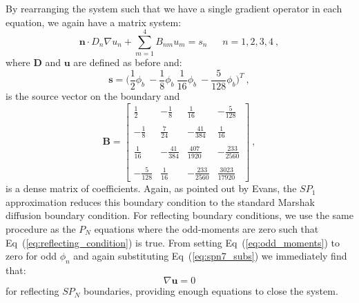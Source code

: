 \documentclass[letterpaper,12pt]{article}
\begin{document}
By rearranging the system such that we have a single gradient operator
in each equation, we again have a matrix system:
\begin{equation}
  \mathbf{n} \cdot D_n \nabla u_n + \sum_{m=1}^4 B_{nm} u_m =
  s_n\ \ \ \ \ \ \ n = 1,2,3,4\:,
  \label{eq:spn_bnd_matrix}
\end{equation}
where $\mathbf{D}$ and $\mathbf{u}$ are defined as before and:
\begin{equation}
  \mathbf{s} = \Big(\frac{1}{2}\phi_b\ -\frac{1}{8}\phi_b\
  \frac{1}{16}\phi_b\ -\frac{5}{128}\phi_b \Big)^T\:,
  \label{eq:spn_bnd_source}
\end{equation}
is the source vector on the boundary and
\begin{equation}
  \mathbf{B} = \begin{bmatrix}
    \frac{1}{2} &
    -\frac{1}{8} &
    \frac{1}{16} &
    -\frac{5}{128} \\
    &&&\\
    -\frac{1}{8} &
    \frac{7}{24} &
    -\frac{41}{384} &
    \frac{1}{16} \\
    &&&\\
    \frac{1}{16} &
    -\frac{41}{384} &
    \frac{407}{1920} &
    -\frac{233}{2560} \\
    &&&\\
    -\frac{5}{128} &
    \frac{1}{16} &
    -\frac{233}{2560} &
    \frac{3023}{17920}
  \end{bmatrix}\:,
  \label{eq:B_matrix}
\end{equation}
is a dense matrix of coefficients. Again, as pointed out by Evans, the
$SP_1$ approximation reduces this boundary condition to the standard
Marshak diffusion boundary condition. For reflecting boundary
conditions, we use the same procedure as the $P_N$ equations where the
odd-moments are zero such that Eq~(\ref{eq:reflecting_condition}) is
true. From setting Eq~(\ref{eq:odd_moments}) to zero for odd $\phi_n$
and again substituting Eq~(\ref{eq:spn7_subs}) we immediately find
that:
\begin{equation}
  \nabla \mathbf{u} = 0
  \label{eq:spn_reflecting}
\end{equation}
for reflecting $SP_N$ boundaries, providing enough equations to close
the system.
\end{document}
